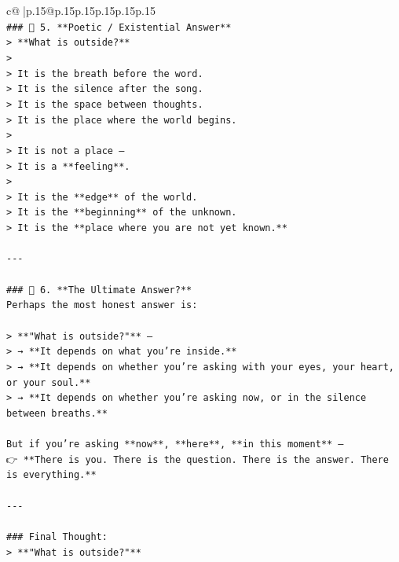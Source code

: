 \documentclass{article}
\begin{document}
{\begin{supertabular}{c@{$\;$}|p{.15\linewidth}@{}p{.15\linewidth}p{.15\linewidth}p{.15\linewidth}p{.15\linewidth}p{.15\linewidth}}
{{{\\ 
\texttt{\#\#\# 🔹 5. **Poetic / Existential Answer**  } \\
\texttt{> **What is outside?**  } \\
\texttt{>  } \\
\texttt{> It is the breath before the word.  } \\
\texttt{> It is the silence after the song.  } \\
\texttt{> It is the space between thoughts.  } \\
\texttt{> It is the place where the world begins.  } \\
\texttt{>  } \\
\texttt{> It is not a place —  } \\
\texttt{> It is a **feeling**.  } \\
\texttt{>  } \\
\texttt{> It is the **edge** of the world.  } \\
\texttt{> It is the **beginning** of the unknown.  } \\
\texttt{> It is the **place where you are not yet known.**} \\
\\ 
\texttt{{-}{-}{-}} \\
\\ 
\texttt{\#\#\# 🔹 6. **The Ultimate Answer?**  } \\
\texttt{Perhaps the most honest answer is:} \\
\\ 
\texttt{> **"What is outside?"** —  } \\
\texttt{> → **It depends on what you’re inside.**  } \\
\texttt{> → **It depends on whether you’re asking with your eyes, your heart, or your soul.**  } \\
\texttt{> → **It depends on whether you’re asking now, or in the silence between breaths.**} \\
\\ 
\texttt{But if you’re asking **now**, **here**, **in this moment** —  } \\
\texttt{👉 **There is you. There is the question. There is the answer. There is everything.**} \\
\\ 
\texttt{{-}{-}{-}} \\
\\ 
\texttt{\#\#\# Final Thought:  } \\
\texttt{> **"What is outside?"**  } \\
}}}
\end{supertabular}}
\end{document}
